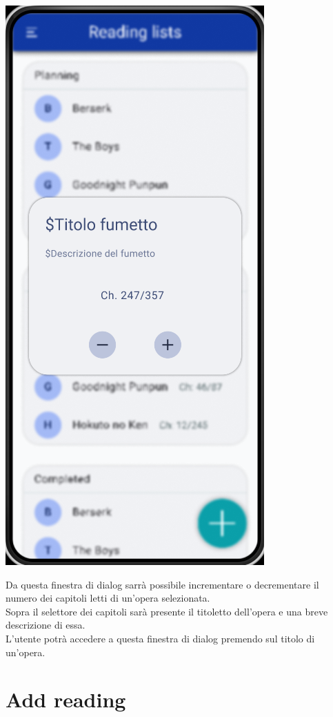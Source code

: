\documentclass{report}
\begin{document}
\begin{center}
   \includegraphics[scale=0.4]{info_reading.png}
\end{center}

Da questa finestra di dialog sarrà possibile incrementare o decrementare il numero dei capitoli letti di un'opera selezionata.\\
Sopra il selettore dei capitoli sarà presente il titoletto dell'opera e una breve descrizione di essa.\\
L'utente potrà accedere a questa finestra di dialog premendo sul titolo di un'opera.\\

\section{Add reading}
\end{document}
